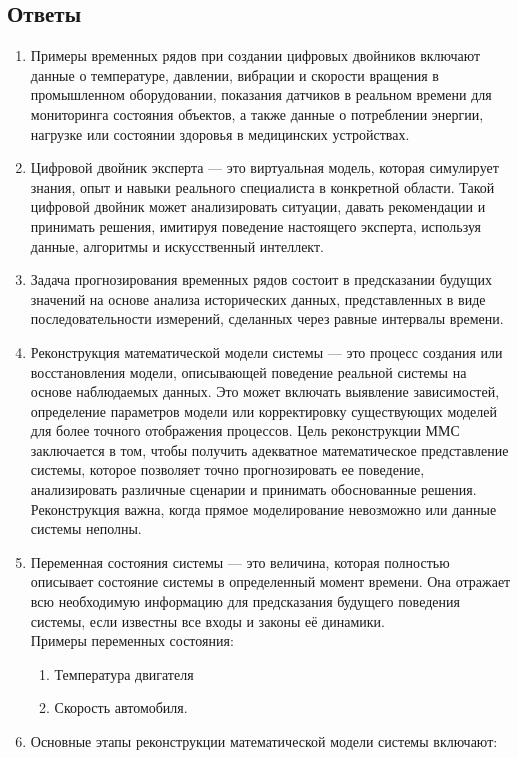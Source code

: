 \documentclass[a4paper, 12pt]{article}
\begin{document}
\subsection*{Ответы}
\begin{enumerate}
  \item Примеры временных рядов при создании цифровых двойников включают данные о температуре, давлении, вибрации и скорости вращения в промышленном оборудовании, показания датчиков в реальном времени для мониторинга состояния объектов, а также данные о потреблении энергии, нагрузке или состоянии здоровья в медицинских устройствах.
  \item Цифровой двойник эксперта — это виртуальная модель, которая симулирует знания, опыт и навыки реального специалиста в конкретной области. Такой цифровой двойник может анализировать ситуации, давать рекомендации и принимать решения, имитируя поведение настоящего эксперта, используя данные, алгоритмы и искусственный интеллект.
  \item Задача прогнозирования временных рядов состоит в предсказании будущих значений на основе анализа исторических данных, представленных в виде последовательности измерений, сделанных через равные интервалы времени.
  \item Реконструкция математической модели системы — это процесс создания или восстановления модели, описывающей поведение реальной системы на основе наблюдаемых данных. Это может включать выявление зависимостей, определение параметров модели или корректировку существующих моделей для более точного отображения процессов.  Цель реконструкции ММС заключается в том, чтобы получить адекватное математическое представление системы, которое позволяет точно прогнозировать ее поведение, анализировать различные сценарии и принимать обоснованные решения. Реконструкция важна, когда прямое моделирование невозможно или данные системы неполны.
  \item Переменная состояния системы — это величина, которая полностью описывает состояние системы в определенный момент времени. Она отражает всю необходимую информацию для предсказания будущего поведения системы, если известны все входы и законы её динамики. \\
  Примеры переменных состояния:
  \begin{enumerate}
    \item Температура двигателя
    \item Скорость автомобиля.
  \end{enumerate}
  \item Основные этапы реконструкции математической модели системы включают:

\end{enumerate}
\end{document}
